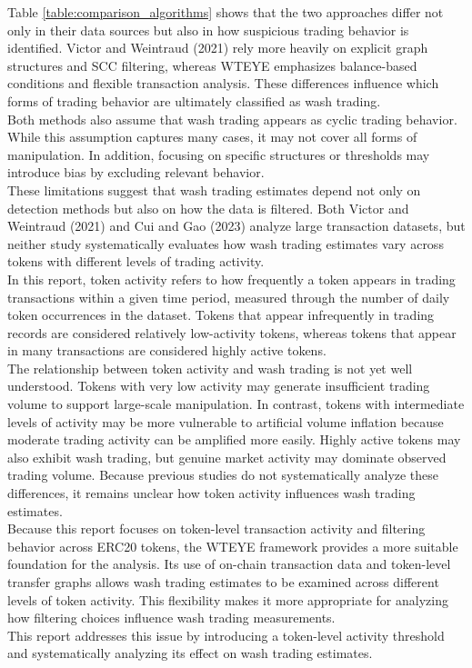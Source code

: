 \documentclass[language=english,thesis=bachelor,nosecondtitle,faculty=cb,onesided,13pt]{hsmw-thesis}
\begin{document}
Table \ref{table:comparison_algorithms} shows that the two approaches differ not only in their data sources but also in how suspicious trading behavior is identified. Victor and Weintraud (2021) rely more heavily on explicit graph structures and SCC filtering, whereas WTEYE emphasizes balance-based conditions and flexible transaction analysis. These differences influence which forms of trading behavior are ultimately classified as wash trading.\\
Both methods also assume that wash trading appears as cyclic trading behavior. While this assumption captures many cases, it may not cover all forms of manipulation. In addition, focusing on specific structures or thresholds may introduce bias by excluding relevant behavior.\\
These limitations suggest that wash trading estimates depend not only on detection methods but also on how the data is filtered. Both Victor and Weintraud (2021) and Cui and Gao (2023) analyze large transaction datasets, but neither study systematically evaluates how wash trading estimates vary across tokens with different levels of trading activity.\\
In this report, token activity refers to how frequently a token appears in trading transactions within a given time period, measured through the number of daily token occurrences in the dataset. Tokens that appear infrequently in trading records are considered relatively low-activity tokens, whereas tokens that appear in many transactions are considered highly active tokens.\\
The relationship between token activity and wash trading is not yet well understood. Tokens with very low activity may generate insufficient trading volume to support large-scale manipulation. In contrast, tokens with intermediate levels of activity may be more vulnerable to artificial volume inflation because moderate trading activity can be amplified more easily. Highly active tokens may also exhibit wash trading, but genuine market activity may dominate observed trading volume. Because previous studies do not systematically analyze these differences, it remains unclear how token activity influences wash trading estimates.\\
Because this report focuses on token-level transaction activity and filtering behavior across ERC20 tokens, the WTEYE framework provides a more suitable foundation for the analysis. Its use of on-chain transaction data and token-level transfer graphs allows wash trading estimates to be examined across different levels of token activity. This flexibility makes it more appropriate for analyzing how filtering choices influence wash trading measurements.\\
This report addresses this issue by introducing a token-level activity threshold and systematically analyzing its effect on wash trading estimates.
\end{document}
